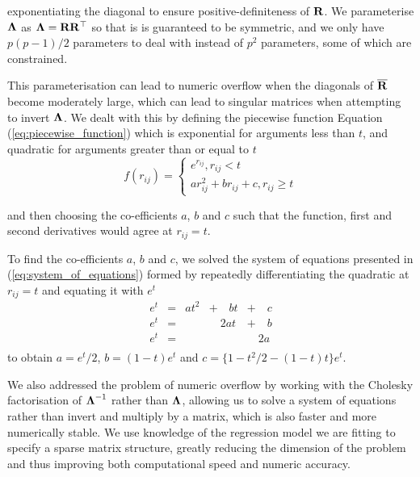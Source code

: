 \noindent exponentiating the diagonal to ensure positive-definiteness of ${\bf R}$. We parameterise ${\boldsymbol \Lambda}$
as ${\boldsymbol \Lambda} = {\bf R} {\bf R}^\top$ so that is is guaranteed to be symmetric, and we only have $p(p-1)/2$ 
parameters to deal with instead of $p^2$ parameters, some of which are constrained. 

This parameterisation can lead to numeric overflow when the diagonals of $\overline{{\bf R}}$ become moderately
large, which can lead to singular matrices when attempting to invert ${\boldsymbol \Lambda}$. We dealt with this by
defining the piecewise function Equation (\ref{eq:piecewise_function}) which is exponential for arguments less
than $t$, and quadratic for arguments greater than or equal to $t$
\begin{equation}
\label{eq:piecewise_function}
f(r_{ij}) =
\begin{cases}
	e^{r_{ij}}, r_{ij} < t                   \\
	a r_{ij}^2 + b r_{ij} + c, r_{ij} \geq t 
\end{cases}
\end{equation}

\noindent and then choosing the co-efficients $a$, $b$ and $c$ such that the function, first and second
derivatives would agree at $r_{ij} = t$.

To find the co-efficients $a$, $b$ and $c$, we solved the system of equations presented in
(\ref{eq:system_of_equations}) formed by repeatedly  differentiating the quadratic at $r_{ij} =  t$ and equating
it with $e^t$
\begin{equation}
\label{eq:system_of_equations}
\begin{array}{lllll}
	e^t & = & a t^2 & + \quad b t & + \quad c \\
	e^t & = &       & \quad 2a t  & + \quad b \\
	e^t & = &       &             & \quad 2a  \\
\end{array}
\end{equation}
\noindent to obtain $a = e^t / 2$, $b = (1 - t) e^t$ and $c = \{1 - t^2/2 - (1 - t) t\} e^t$.

We also addressed the problem of numeric overflow by working with the Cholesky factorisation of ${\boldsymbol \Lambda}^{-1}$
rather than ${\boldsymbol \Lambda}$, allowing us to solve a system of equations rather than invert and multiply by a
matrix, which is also faster and more numerically stable. We use knowledge of the regression  model we are
fitting to specify a sparse matrix structure, greatly reducing the dimension of   the problem and thus
improving both computational speed and numeric accuracy.

